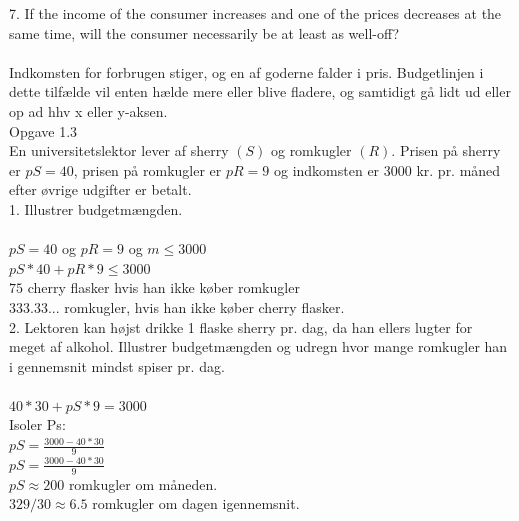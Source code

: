 \documentclass{article}
\begin{document}
7. If the income of the consumer increases and one of the prices decreases at the same time, will the consumer necessarily be at least as well-off? \\ \\
Indkomsten for forbrugen stiger, og en af goderne falder i pris. Budgetlinjen i dette tilfælde vil enten hælde mere eller blive fladere, og samtidigt gå lidt ud eller op ad hhv x eller y-aksen. \\


Opgave 1.3 \\
En universitetslektor lever af sherry $(S)$ og romkugler $(R)$. Prisen på sherry er
$pS = 40$, prisen på romkugler er $pR = 9$ og indkomsten er 3000 kr. pr. måned
efter øvrige udgifter er betalt. \\
1. Illustrer budgetmængden. \\ \\
$pS=40$ og $pR=9$ og $m\leq3000$ \\
$pS*40+pR*9\leq3000$ \\
$75$ cherry flasker hvis han ikke køber romkugler \\
$333.33...$ romkugler, hvis han ikke køber cherry flasker. \\



2. Lektoren kan højst drikke 1 flaske sherry pr. dag, da han ellers lugter for
meget af alkohol. Illustrer budgetmængden og udregn hvor mange romkugler
han i gennemsnit mindst spiser pr. dag. \\ \\
$40*30+pS*9=3000$ \\
Isoler Ps:\\
$pS=\frac{3000-40*30}{9}$ \\
$pS=\frac{3000-40*30}{9}$ \\
$pS\approx 200$ romkugler om måneden. \\
$329/30\approx6.5$ romkugler om dagen igennemsnit. 

\newpage
\end{document}
